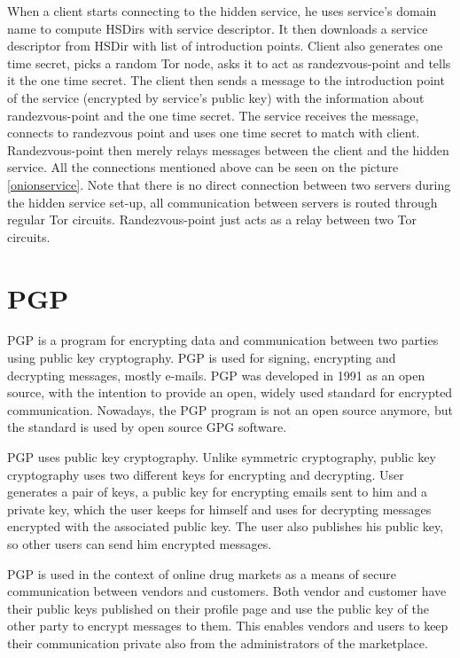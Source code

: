 \documentclass[
  digital, %
  table,   %
  lof,     %
  lot,     %
  oneside
]{fithesis3}
\begin{document}
When a client starts connecting to the hidden service, he uses service's domain name 
to compute HSDirs with service descriptor. It then downloads a service descriptor from HSDir with list
of introduction points. Client also generates one time secret, picks a random Tor node, asks
it to act as randezvous-point and tells it the one time secret. 
The client then sends a message to the introduction point of the service (encrypted by service's public key)
with the information about randezvous-point and the one time secret. The service receives the message, connects 
to randezvous point and uses one time secret to match with client.
Randezvous-point then merely relays messages between the client and the hidden service.
All the connections mentioned above can be seen on the picture \ref{onionservice}.
Note that there is no direct connection between two servers during the hidden service set-up,
all communication between servers is routed through regular Tor circuits.
Randezvous-point just acts as a relay between two Tor circuits.

\section{PGP}

PGP \cite{Zimmermann:1995:OPU:202735} is a program for encrypting data
and communication between two parties using public key cryptography.
PGP is used for signing, encrypting and decrypting messages, mostly e-mails.
PGP was developed in 1991 as an open source, with the intention 
to provide an open, widely used standard for encrypted communication.
Nowadays, the PGP program is not an open source anymore, but the standard is used by open source GPG software.

PGP uses public key cryptography. Unlike symmetric cryptography, public key cryptography
uses two different keys for encrypting and decrypting.
User generates a pair of keys, a public key for encrypting emails sent to him and a private key, which the user
 keeps for himself and uses for decrypting messages encrypted with the associated public key.
 The user also publishes his public key, so other users can send him encrypted messages.

PGP is used in the context of online drug markets as a means of secure communication between vendors and customers.
Both vendor and customer have their public keys published on their profile page and use the public key of the other
party to encrypt messages to them. This enables vendors and users to keep their communication private also from the administrators of the marketplace.
\end{document}
